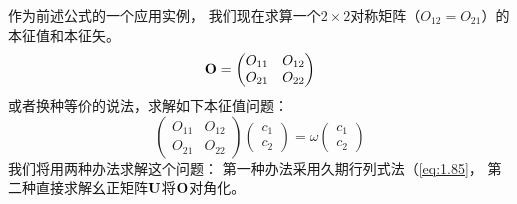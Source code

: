 作为前述公式的一个应用实例，
我们现在求算一个$2\times 2$对称矩阵（$O_{12}=O_{21}$）的本征值和本征矢。
\[\mathbf{O} = \begin{pmatrix}
 O_{11} & O_{12} \\ O_{21} & O_{22}
\end{pmatrix}\]
或者换种等价的说法，求解如下本征值问题：
\begin{equation}
 \begin{pmatrix}
     O_{11} & O_{12} \\ O_{21} &O_{22}
 \end{pmatrix} \begin{pmatrix}
     c_1 \\ c_2
 \end{pmatrix} = \omega \begin{pmatrix}
     c_1 \\ c_2
 \end{pmatrix}
 \label{eq:1.94}
\end{equation}
我们将用两种办法求解这个问题：
第一种办法采用久期行列式法（\autoref{eq:1.85}，
第二种直接求解幺正矩阵$\mathbf U$将$\mathbf O$对角化。

